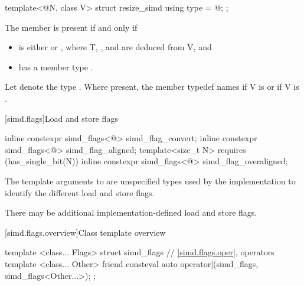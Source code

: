 \begin{itemdecl}
template<@\simdsizetype@ N, class V> struct resize_simd { using type = @\seebelow@; };
\end{itemdecl}

\begin{itemdescr}
  \pnum
  The member  is present if and only if
  \begin{itemize}
    \item {} is either  or , where \tcode T, , and  are deduced from \tcode V, and
    \item {} has a member type .
  \end{itemize}

  \pnum
  Let  denote the type .
  Where present, the member typedef  names  if \tcode V is  or  if \tcode V is .
\end{itemdescr}

[simd.flags]{Load and store flags}

\begin{itemdecl}
inline constexpr simd_flags<@\seebelow@> simd_flag_convert{};
inline constexpr simd_flags<@\seebelow@> simd_flag_aligned{};
template<size_t N> requires (has_single_bit(N))
  inline constexpr simd_flags<@\seebelow@> simd_flag_overaligned{};
\end{itemdecl}

\begin{itemdescr}
  \pnum
  The template arguments to  are unspecified types used
  by the implementation to identify the different load and store flags.

  \pnum
  There may be additional implementation-defined load and store flags.
\end{itemdescr}

[simd.flags.overview]{Class template  overview}

\begin{codeblock}
template <class... Flags> struct simd_flags {
  // \ref{simd.flags.oper},  operators
  template <class... Other>
    friend consteval auto operator|(simd_flags, simd_flags<Other...>);
};
\end{codeblock}

